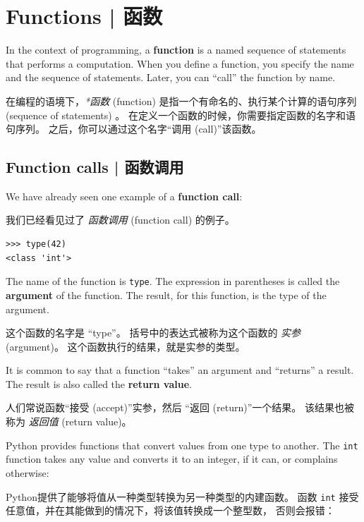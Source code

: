 
\chapter{Functions  |  函数}
\label{funcchap}

In the context of programming, a {\bf function} is a named sequence of
statements that performs a computation.  When you define a function,
you specify the name and the sequence of statements.  Later, you can
``call'' the function by name.

在编程的语境下，\emph{*函数} (function)  是指一个有命名的、执行某个计算的语句序列(sequence of statements) 。  在定义一个函数的时候，你需要指定函数的名字和语句序列。  之后，你可以通过这个名字``调用 (call)''该函数。


%
\section{Function calls  |  函数调用}
\label{functionchap}

We have already seen one example of a {\bf function call}:

我们已经看见过了 \emph{函数调用} (function call) 的例子。

\begin{lstlisting}
>>> type(42)
<class 'int'>
\end{lstlisting}
%
The name of the function is {\tt type}.  The expression in parentheses
is called the {\bf argument} of the function.  The result, for this
function, is the type of the argument.

这个函数的名字是 ``type''。 括号中的表达式被称为这个函数的 \emph{实参} (argument)。 这个函数执行的结果，就是实参的类型。

It is common to say that a function ``takes'' an argument and ``returns''
a result.  The result is also called the {\bf return value}.

人们常说函数``接受 (accept)''实参，然后 ``返回 (return)''一个结果。
该结果也被称为 \emph{返回值} (return value)。
  
  

Python provides functions that convert values
from one type to another.  The {\tt int} function takes any value and
converts it to an integer, if it can, or complains otherwise:

Python提供了能够将值从一种类型转换为另一种类型的内建函数。
函数 \lstinline{int} 接受任意值，并在其能做到的情况下，将该值转换成一个整型数，
否则会报错：
  
  
  
  

